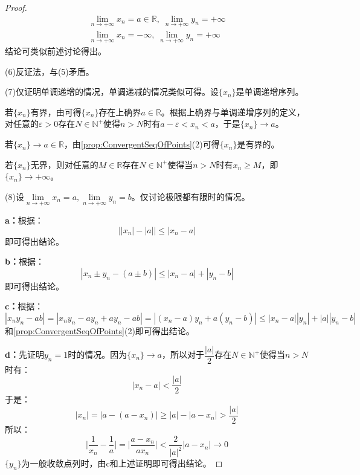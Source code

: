 \begin{proof}
\begin{gather*}
		\lim_{n\to+\infty}x_n=a\in\mathbb{R},\;\lim_{n\to+\infty}y_n=+\infty \\
		\lim_{n\to+\infty}x_n=-\infty,\;\lim_{n\to+\infty}y_n=+\infty
	\end{gather*}
	结论可类似前述讨论得出。\par
	(6)反证法，与(5)矛盾。\par
	(7)仅证明单调递增的情况，单调递减的情况类似可得。设$\{x_n\}$是单调递增序列。\par
	若$\{x_n\}$有界，由可得$\{x_n\}$存在上确界$a\in\mathbb{R}$。根据上确界与单调递增序列的定义，对任意的$\varepsilon>0$存在$N\in\mathbb{N}^+$使得$n>N$时有$a-\varepsilon<x_n<a$，于是$\{x_n\}\to a$。\par
	若$\{x_n\}\to a\in\mathbb{R}$，由\cref{prop:ConvergentSeqOfPoints}(2)可得$\{x_n\}$是有界的。\par
	若$\{x_n\}$无界，则对任意的$M\in\mathbb{R}$存在$N\in\mathbb{N}^+$使得当$n>N$时有$x_n\geqslant M$，即$\{x_n\}\to+\infty$。\par
	(8)设$\lim\limits_{n\to+\infty}x_n=a,\lim\limits_{n\to+\infty}y_n=b$。仅讨论极限都有限时的情况。\par
	\textbf{ a：}根据：
	\begin{equation*}
		\Big||x_n|-|a|\Big|\leqslant|x_n-a|
	\end{equation*}
	即可得出结论。\par
	\textbf{b：}根据：
	\begin{equation*}
		|x_n\pm y_n-(a\pm b)|\leqslant|x_n-a|+|y_n-b|
	\end{equation*}
	即可得出结论。\par
	\textbf{c：}根据：
	\begin{equation*}
		|x_ny_n-ab|=|x_ny_n-ay_n+ay_n-ab|=|(x_n-a)y_n+a(y_n-b)|\leqslant|x_n-a||y_n|+|a||y_n-b|
	\end{equation*}
	和\cref{prop:ConvergentSeqOfPoints}(2)即可得出结论。\par
	\textbf{d：}先证明$y_n=1$时的情况。因为$\{x_n\}\to a$，所以对于$\dfrac{|a|}{2}$存在$N\in\mathbb{N}^+$使得当$n>N$时有：
	\begin{equation*}
		|x_n-a|<\frac{|a|}{2}
	\end{equation*}
	于是：
	\begin{equation*}
		|x_n|=|a-(a-x_n)|\geqslant|a|-|a-x_n|>\frac{|a|}{2}
	\end{equation*}
	所以：
	\begin{equation*}
		\Big|\frac{1}{x_n}-\frac{1}{a}\Big|=\Big|\frac{a-x_n}{ax_n}\Big|<\frac{2}{|a|^2}|a-x_n|\to0
	\end{equation*}
	$\{y_n\}$为一般收敛点列时，由c和上述证明即可得出结论。
\end{proof}
